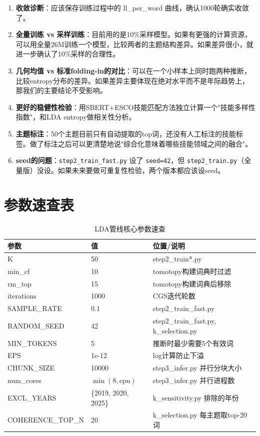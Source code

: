 \documentclass[12pt,a4paper]{ctexart}
\begin{document}
\begin{enumerate}
\item \textbf{收敛诊断}：应该保存训练过程中的 ll\_per\_word 曲线，确认1000轮确实收敛了。
\item \textbf{全量训练 vs 采样训练}：目前用的是10\%采样模型。如果有更强的计算资源，可以用全量26M训练一个模型，比较两者的主题结构差异。如果差异很小，就进一步确认了10\%采样的合理性。
\item \textbf{几何均值 vs 标准folding-in的对比}：可以在一个小样本上同时跑两种推断，比较entropy分布的差异。如果差异主要体现在绝对水平而不是年际趋势上，那我们的主要结论不受影响。
\item \textbf{更好的稳健性检验}：用SBERT+ESCO技能匹配方法独立计算一个"技能多样性指数"，和LDA entropy做相关性分析。
\item \textbf{主题标注}：50个主题目前只有自动提取的top词，还没有人工标注的技能标签。做了标注之后可以更清楚地说"综合化意味着哪些技能领域之间的融合"。
\item \textbf{seed的问题}：\texttt{step2\_train\_fast.py} 设了 \texttt{seed=42}，但 \texttt{step2\_train.py}（全量版）没设。如果未来要做可重复性检验，两个版本都应该设seed。
\end{enumerate}


\section{参数速查表}
\label{sec:cheatsheet}

\begin{table}[h]
\centering
\small
\begin{tabular}{p{3cm}p{2.5cm}p{7cm}}
\toprule
\textbf{参数} & \textbf{值} & \textbf{位置/说明} \\
\midrule
K & 50 & step2\_train*.py \\
min\_cf & 10 & tomotopy构建词典时过滤 \\
rm\_top & 15 & tomotopy构建词典后移除 \\
iterations & 1000 & CGS迭代轮数 \\
SAMPLE\_RATE & 0.1 & step2\_train\_fast.py \\
RANDOM\_SEED & 42 & step2\_train\_fast.py, k\_selection.py \\
MIN\_TOKENS & 5 & 推断时最少需要5个有效词 \\
EPS & 1e-12 & log计算防止下溢 \\
CHUNK\_SIZE & 10000 & step3\_infer.py 并行分块大小 \\
num\_cores & $\min(8, \text{cpu})$ & step3\_infer.py 并行进程数 \\
EXCL\_YEARS & \{2019, 2020, 2025\} & k\_sensitivity.py 排除的年份 \\
COHERENCE\_TOP\_N & 20 & k\_selection.py 每主题取top-20词 \\
\bottomrule
\end{tabular}
\caption{LDA管线核心参数速查}
\end{table}
\end{document}
